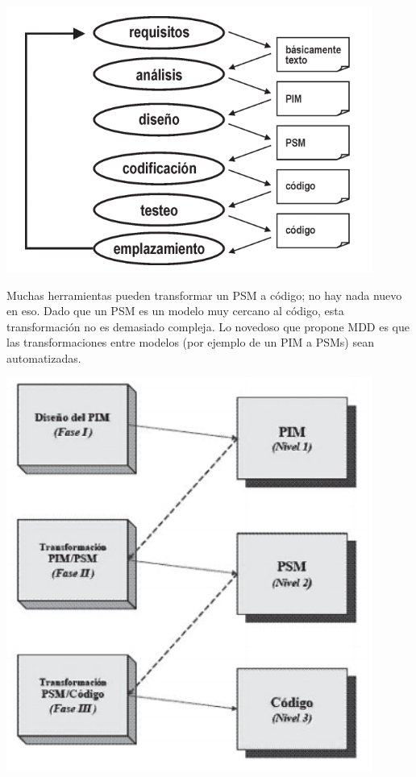 \begin{center}
    \includegraphics[width=12cm]{./Imagenes/mdd4}
    \end{center}

Muchas herramientas pueden transformar un PSM a código; no hay nada nuevo en eso. Dado que un PSM es un modelo muy cercano al código, esta transformación no es demasiado compleja. Lo novedoso que propone MDD es que las transformaciones entre modelos (por ejemplo de un PIM a PSMs) sean automatizadas.

\begin{center}
    \includegraphics[width=12cm]{./Imagenes/mdd5}
    \end{center}

